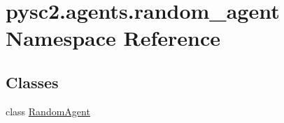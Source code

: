 \hypertarget{namespacepysc2_1_1agents_1_1random__agent}{}\section{pysc2.\+agents.\+random\+\_\+agent Namespace Reference}
\label{namespacepysc2_1_1agents_1_1random__agent}
\subsection*{Classes}
\begin{DoxyCompactItemize}
\item 
class \mbox{\hyperlink{classpysc2_1_1agents_1_1random__agent_1_1_random_agent}{Random\+Agent}}
\end{DoxyCompactItemize}
